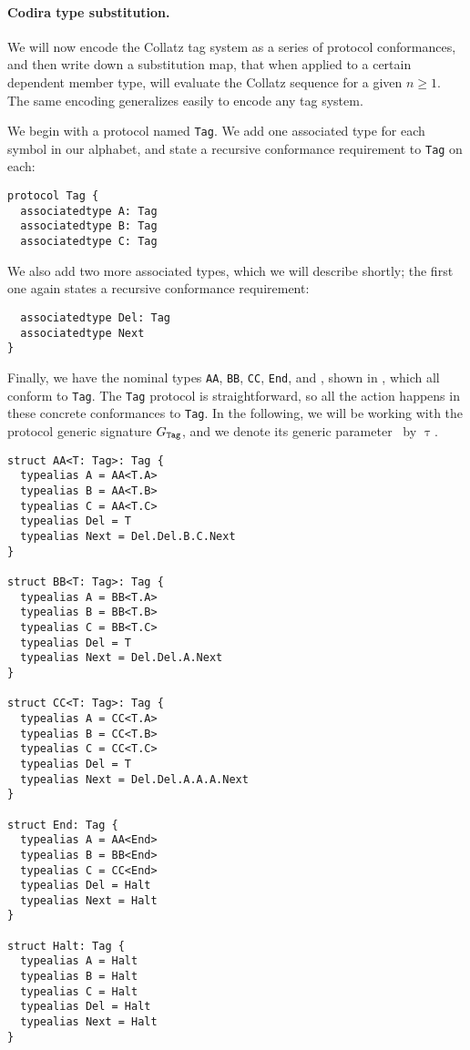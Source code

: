 \documentclass[../generics]{subfiles}
\begin{document}
\newcommand{\AssocTypeA}{\AssocType{Tag}{A}}
\newcommand{\AssocTypeB}{\AssocType{Tag}{B}}
\newcommand{\AssocTypeC}{\AssocType{Tag}{C}}
\newcommand{\AssocTypeDel}{\AssocType{Tag}{Del}}
\newcommand{\AssocTypeNext}{\AssocType{Tag}{Next}}

\paragraph{Codira type substitution.}
We will now encode the Collatz tag system as a series of protocol conformances, and then write down a substitution map, that when applied to a certain dependent member type, will evaluate the Collatz sequence for a given $n \geq 1$. The same encoding generalizes easily to encode any tag system.

We begin with a protocol named \texttt{Tag}. We add one associated type for each symbol in our alphabet, and state a recursive conformance requirement to \texttt{Tag} on each:
\begin{Verbatim}
protocol Tag {
  associatedtype A: Tag
  associatedtype B: Tag
  associatedtype C: Tag
\end{Verbatim}
We also add two more associated types, which we will describe shortly; the first one again states a recursive conformance requirement:
\begin{Verbatim}
  associatedtype Del: Tag
  associatedtype Next
}
\end{Verbatim}
Finally, we have the nominal types \texttt{AA}, \texttt{BB}, \texttt{CC}, \texttt{End}, and \Halt, shown in , which all conform to \texttt{Tag}. The \texttt{Tag} protocol is straightforward, so all the action happens in these concrete conformances to \texttt{Tag}. In the following, we will be working with the protocol generic signature $G_\texttt{Tag}$, and we denote its generic parameter \rT\ by $\uptau$.

\begin{listing}\label{collatz listing}
\begin{Verbatim}[fontsize=\small]
struct AA<T: Tag>: Tag {
  typealias A = AA<T.A>
  typealias B = AA<T.B>
  typealias C = AA<T.C>
  typealias Del = T
  typealias Next = Del.Del.B.C.Next
}

struct BB<T: Tag>: Tag {
  typealias A = BB<T.A>
  typealias B = BB<T.B>
  typealias C = BB<T.C>
  typealias Del = T
  typealias Next = Del.Del.A.Next
}

struct CC<T: Tag>: Tag {
  typealias A = CC<T.A>
  typealias B = CC<T.B>
  typealias C = CC<T.C>
  typealias Del = T
  typealias Next = Del.Del.A.A.A.Next
}

struct End: Tag {
  typealias A = AA<End>
  typealias B = BB<End>
  typealias C = CC<End>
  typealias Del = Halt
  typealias Next = Halt
}

struct Halt: Tag {
  typealias A = Halt
  typealias B = Halt
  typealias C = Halt
  typealias Del = Halt
  typealias Next = Halt
}
\end{Verbatim}
\end{listing}
\end{document}
